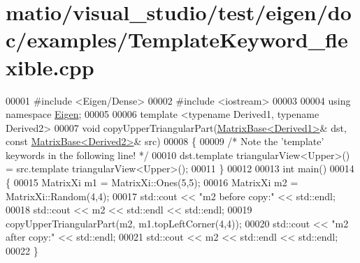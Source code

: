 \hypertarget{matio_2visual__studio_2test_2eigen_2doc_2examples_2_template_keyword__flexible_8cpp_source}{}\section{matio/visual\+\_\+studio/test/eigen/doc/examples/\+Template\+Keyword\+\_\+flexible.cpp}
\label{matio_2visual__studio_2test_2eigen_2doc_2examples_2_template_keyword__flexible_8cpp_source}

\begin{DoxyCode}
00001 \textcolor{preprocessor}{#include <Eigen/Dense>}
00002 \textcolor{preprocessor}{#include <iostream>}
00003 
00004 \textcolor{keyword}{using namespace }\hyperlink{namespace_eigen}{Eigen};
00005 
00006 \textcolor{keyword}{template} <\textcolor{keyword}{typename} Derived1, \textcolor{keyword}{typename} Derived2>
00007 \textcolor{keywordtype}{void} copyUpperTriangularPart(\hyperlink{group___core___module_class_eigen_1_1_matrix_base}{MatrixBase<Derived1>}& dst, \textcolor{keyword}{const} 
      \hyperlink{group___core___module_class_eigen_1_1_matrix_base}{MatrixBase<Derived2>}& src)
00008 \{
00009   \textcolor{comment}{/* Note the 'template' keywords in the following line! */}
00010   dst.template triangularView<Upper>() = src.template triangularView<Upper>();
00011 \}
00012 
00013 \textcolor{keywordtype}{int} main()
00014 \{
00015   MatrixXi m1 = MatrixXi::Ones(5,5);
00016   MatrixXi m2 = MatrixXi::Random(4,4);
00017   std::cout << \textcolor{stringliteral}{"m2 before copy:"} << std::endl;
00018   std::cout << m2 << std::endl << std::endl;
00019   copyUpperTriangularPart(m2, m1.topLeftCorner(4,4));
00020   std::cout << \textcolor{stringliteral}{"m2 after copy:"} << std::endl;
00021   std::cout << m2 << std::endl << std::endl;
00022 \}
\end{DoxyCode}
